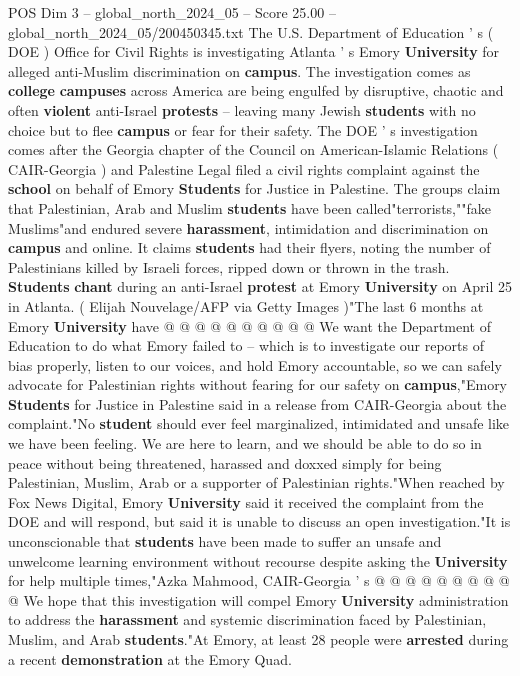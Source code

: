 \begin{textsample}{POS Dim 3 – global\_north\_2024\_05 – Score 25.00 – global\_north\_2024\_05/200450345.txt}  \label{ex:f3_pos_015}
The U.S.
Department of Education ' s ( DOE ) Office for Civil Rights is investigating Atlanta ' s Emory \textbf{University} for alleged anti-Muslim discrimination on \textbf{campus}.
The investigation comes as \textbf{college} \textbf{campuses} across America are being engulfed by disruptive, chaotic and often \textbf{violent} anti-Israel \textbf{protests} -- leaving many Jewish \textbf{students} with no choice but to flee \textbf{campus} or fear for their safety.
The DOE ' s investigation comes after the Georgia chapter of the Council on American-Islamic Relations ( CAIR-Georgia ) and Palestine Legal filed a civil rights complaint against the \textbf{school} on behalf of Emory \textbf{Students} for Justice in Palestine.
The groups claim that Palestinian, Arab and Muslim \textbf{students} have been called"terrorists,""fake Muslims"and endured severe \textbf{harassment}, intimidation and discrimination on \textbf{campus} and online.
It claims \textbf{students} had their flyers, noting the number of Palestinians killed by Israeli forces, ripped down or thrown in the trash. \textbf{Students} \textbf{chant} during an anti-Israel \textbf{protest} at Emory \textbf{University} on April 25 in Atlanta. ( Elijah Nouvelage/AFP via Getty Images )"The last 6 months at Emory \textbf{University} have @ @ @ @ @ @ @ @ @ @ We want the Department of Education to do what Emory failed to -- which is to investigate our reports of bias properly, listen to our voices, and hold Emory accountable, so we can safely advocate for Palestinian rights without fearing for our safety on \textbf{campus},"Emory \textbf{Students} for Justice in Palestine said in a release from CAIR-Georgia about the complaint."No \textbf{student} should ever feel marginalized, intimidated and unsafe like we have been feeling.
We are here to learn, and we should be able to do so in peace without being threatened, harassed and doxxed simply for being Palestinian, Muslim, Arab or a supporter of Palestinian rights."When reached by Fox News Digital, Emory \textbf{University} said it received the complaint from the DOE and will respond, but said it is unable to discuss an open investigation."It is unconscionable that \textbf{students} have been made to suffer an unsafe and unwelcome learning environment without recourse despite asking the \textbf{University} for help multiple times,"Azka Mahmood, CAIR-Georgia ' s @ @ @ @ @ @ @ @ @ @ We hope that this investigation will compel Emory \textbf{University} administration to address the \textbf{harassment} and systemic discrimination faced by Palestinian, Muslim, and Arab \textbf{students}."At Emory, at least 28 people were \textbf{arrested} during a recent \textbf{demonstration} at the Emory Quad.

\end{textsample}
